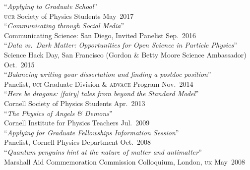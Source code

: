\documentclass[margin,line]{resume}
\newcommand{\mytalksep}{-.1mm}
\newcommand{\mytalkskip}{2mm}
\newcommand{\scap}[1]{\textsc{\MakeLowercase{#1}}}
\begin{document}
\begin{resume}
%
``\emph{Applying to Graduate School}''\vspace{\mytalksep}\\ 
\scap{UCR} Society of Physics Students \hfill May~{2017}\vspace{\mytalkskip}\\ 
%
``\emph{Communicating through Social Media}''\vspace{\mytalksep}\\ 
Communicating Science: San Diego, Invited Panelist \hfill Sep.~{2016}\vspace{\mytalkskip}\\ 
%
``\emph{Data vs.\ Dark Matter: Opportunities for Open Science in Particle Physics}''\vspace{\mytalksep}\\ 
Science Hack Day, San Francisco (Gordon \& Betty Moore Science Ambassador) \hfill Oct.~{2015}\vspace{\mytalkskip}\\ 
%
``\emph{Balancing writing your dissertation and finding a postdoc position}''\vspace{\mytalksep}\\ 
Panelist, \scap{UCI} Graduate Division \& \textsc{advace} Program \hfill Nov.~{2014}\vspace{\mytalkskip}\\ 
%
``\emph{Here be dragons: [fairy] tales from beyond the Standard Model}''\vspace{\mytalksep}\\ 
Cornell Society of Physics Students \hfill Apr.~{2013}\vspace{\mytalkskip}\\ 
%
``\emph{The Physics of \emph{Angels \& Demons}}''\vspace{\mytalksep}\\ 
Cornell Institute for Physics Teachers \hfill Jul.~{2009}\vspace{\mytalkskip}\\ 
%
``\emph{Applying for Graduate Fellowships Information Session}''\vspace{\mytalksep}\\ 
Panelist, Cornell Physics Department \hfill Oct.~{2008}\vspace{\mytalkskip}\\ 
%
``\emph{Quantum penguins hint at the nature of matter and antimatter}'' \vspace{\mytalksep}\\ 
Marshall Aid Commemoration Commission Colloquium, London, \scap{UK}
\hfill %
May~2008%





\end{resume}
\end{document}
